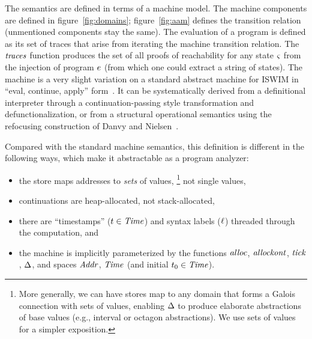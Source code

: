 \documentclass[preprint,onecolumn,9pt]{sigplanconf} %
\begin{document}
The semantics are defined in terms of a machine model.
%
The machine components are defined in figure~\ref{fig:domains};
%
figure~\ref{fig:aam} defines the transition relation (unmentioned components stay the same).
%
The evaluation of a program is defined as its set of traces that arise from iterating the machine transition relation.
%
The $\mathit{traces}$ function produces the set of all proofs of reachability for any state $\varsigma$ from the injection of program $e$ (from which one could extract a string of states).
%
 The machine is a very slight variation on a standard abstract machine for ISWIM in ``eval, continue, apply'' form~\cite{dvanhorn:Danvy:DSc}.
%
It can be systematically derived from a definitional interpreter through a continuation-passing style transformation and defunctionalization, or from a structural operational semantics using the refocusing construction of Danvy and Nielsen~\cite{dvanhorn:Danvy-Nielsen:RS-04-26}.

Compared with the standard machine semantics, this definition is
different in the following ways, which make it abstractable as a
program analyzer:
\begin{itemize}
\item the store maps addresses to \emph{sets} of values,
%
\footnote{
More generally, we can have stores map to any domain that forms a Galois connection with sets of values, enabling $\Delta$ to produce elaborate abstractions of base values (e.g., interval or octagon abstractions).
%
We use sets of values for a simpler exposition.
}
%
not single values,

\item continuations are heap-allocated, not stack-allocated,
%
\item there are ``timestamps'' (${t} \in \mathit{Time}$) and syntax labels (${\ell}$) threaded through the computation, and
%
\item the machine is implicitly parameterized by the functions $\mathit{alloc}$, $\mathit{allockont}$, $\mathit{tick}$, $\Delta$, and spaces $\mathit{Addr}$, $\mathit{Time}$ (and initial ${t}_0 \in \mathit{Time}$).
\end{itemize}
\end{document}
